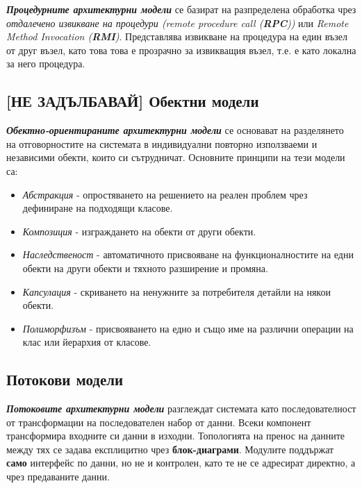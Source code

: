 \documentclass[fleqn,12pt]{article}
\begin{document}
\textbf{\textit{Процедурните архитектурни модели}} се базират на разпределена обработка чрез \textit{отдалечено извикване на процедури (remote procedure call (\textbf{RPC}))} или \textit{Remote Method Invocation (\textbf{RMI})}.
Представлява извикване на процедура на един възел от друг възел, като това това е прозрачно за извикващия възел, т.е. е като локална за него процедура.

\subsection{[НЕ ЗАДЪЛБАВАЙ] Обектни модели}

\textbf{\textit{Обектно-ориентираните архитектурни модели}} се основават на разделянето на отговорностите на системата в индивидуални повторно използваеми и независими обекти, които си сътрудничат.
Основните принципи на тези модели са:
\begin{itemize}
    \item \textit{Абстракция} - опростяването на решението на реален проблем чрез дефиниране на подходящи класове.
    \item \textit{Композиция} - изграждането на обекти от други обекти.
    \item \textit{Наследственост} - автоматичното присвояване на функционалностите на едни обекти на други обекти и тяхното разширение и промяна.
    \item \textit{Капсулация} - скриването на ненужните за потребителя детайли на някои обекти.
    \item \textit{Полиморфизъм} - присвояването на едно и също име на различни операции на клас или йерархия от класове.
\end{itemize}

\subsection{Потокови модели}

\textbf{\textit{Потоковите архитектурни модели}} разглеждат системата като последователност от трансформации на последователен набор от данни.
Всеки компонент трансформира входните си данни в изходни.
Топологията на пренос на данните между тях се задава експлицитно чрез \textbf{блок-диаграми}.
Модулите поддържат \textbf{само} интерфейс по данни, но не и контролен, като те не се адресират директно, а чрез предаваните данни.
\end{document}
